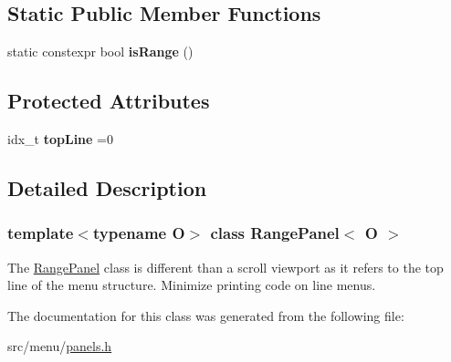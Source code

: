 \subsection*{Static Public Member Functions}
\begin{DoxyCompactItemize}
\item 
\mbox{\label{classRangePanel_ab5afc2b81ec2f1d43e4c13d103168e7c}} 
static constexpr bool {\bfseries is\+Range} ()
\end{DoxyCompactItemize}
\subsection*{Protected Attributes}
\begin{DoxyCompactItemize}
\item 
\mbox{\label{classRangePanel_ae51c75c38328641275d6af9c61bd838f}} 
idx\+\_\+t {\bfseries top\+Line} =0
\end{DoxyCompactItemize}


\subsection{Detailed Description}
\subsubsection*{template$<$typename O$>$\newline
class Range\+Panel$<$ O $>$}

The \hyperlink{classRangePanel}{Range\+Panel} class is different than a scroll viewport as it refers to the top line of the menu structure. Minimize printing code on line menus. 

The documentation for this class was generated from the following file\+:\begin{DoxyCompactItemize}
\item 
src/menu/\hyperlink{panels_8h}{panels.\+h}\end{DoxyCompactItemize}
